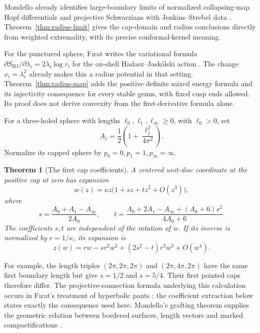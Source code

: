 \documentclass[11pt,a4paper]{article}
\newtheorem{theorem}{Theorem}[section]
\theoremstyle{definition}
\begin{document}
Mondello already identifies large-boundary limits of normalized collapsing-map Hopf differentials and projective Schwarzians with Jenkins--Strebel data \cite[Theorem~5.12, p.~666]{Mondello}. Theorem~\ref{thm:radius-limit} gives the cap-domain and radius conclusions directly from weighted extremality, with its precise conformal-kernel meaning.

For the punctured sphere, F\i rat writes the variational formula
$\partial S_{\mathrm{HJ}}/\partial\lambda_i=2\lambda_i\log r_i$
for the on-shell Hadasz--Jask\'olski action
\cite[Appendix~B, equation~(B.1), p.~44]{Firat2023}.
The change $x_i=\lambda_i^2$ already makes this a radius potential in that setting. Theorem~\ref{thm:radius-map} adds the positive definite mixed energy formula and its injectivity consequence for every stable genus, with fixed cusp ends allowed. Its proof does not derive convexity from the first-derivative formula alone.

For a three-holed sphere with lengths $\ell_0,\ell_1,\ell_\infty\ge0$, with $\ell_0>0$, set
\[
 A_j=\frac12\left(1+\frac{\ell_j^2}{4\pi^2}\right).
\]
Normalize its capped sphere by $p_0=0,p_1=1,p_\infty=\infty$.
\begin{theorem}[The first cap coefficients]\label{thm:jets}
A centered unit-disc coordinate at the positive cap at zero has expansion
\[
 w(z)=\kappa z\bigl(1+s z+t z^2+O(z^3)\bigr),
\]
where
\[
 s=\frac{A_0+A_1-A_\infty}{2A_0},\qquad
 t=\frac{A_0+2A_1-A_\infty+(A_0+6)s^2}{4A_0+6}.
\]
The coefficients $s,t$ are independent of the rotation of $w$. If its inverse is normalized by $r=1/\kappa$, its expansion is
\[
 z(w)=rw-sr^2w^2+(2s^2-t)r^3w^3+O(w^4).
\]
\end{theorem}

For example, the length triples $(2\pi,2\pi,2\pi)$ and $(2\pi,4\pi,2\pi)$ have the same first boundary length but give $s=1/2$ and $s=5/4$. Their first pointed caps therefore differ. The projective-connection formula underlying this calculation occurs in F\i rat's treatment of hyperbolic pants \cite[equations~(1.3a), (3.5)--(3.6) and~(3.11)]{Firat}; the coefficient extraction below states exactly the consequence used here. Mondello's grafting theorem supplies the geometric relation between bordered surfaces, length vectors and marked compactifications \cite[Theorem~5.4]{Mondello}.
\end{document}
